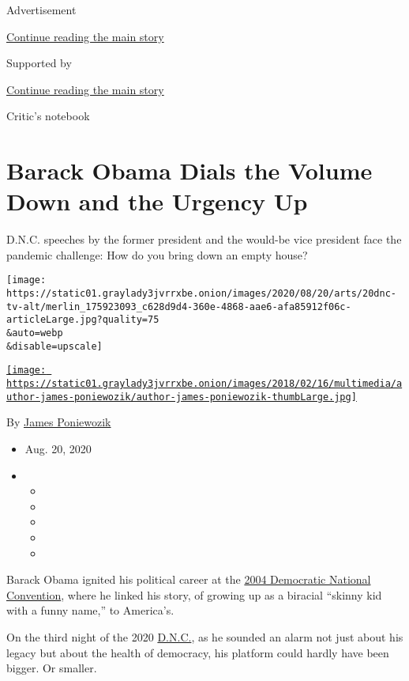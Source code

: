 Advertisement

\protect\hyperlink{after-top}{Continue reading the main story}

Supported by

\protect\hyperlink{after-sponsor}{Continue reading the main story}

Critic's notebook

\hypertarget{barack-obama-dials-the-volume-down-and-the-urgency-up}{%
\section{Barack Obama Dials the Volume Down and the Urgency
Up}\label{barack-obama-dials-the-volume-down-and-the-urgency-up}}

D.N.C. speeches by the former president and the would-be vice president
face the pandemic challenge: How do you bring down an empty house?

\texttt{[image: https://static01.graylady3jvrrxbe.onion/images/2020/08/20/arts/20dnc-tv-alt/merlin\_175923093\_c628d9d4-360e-4868-aae6-afa85912f06c-articleLarge.jpg?quality=75\\\&auto=webp\\\&disable=upscale]}

\href{https://www.nytimes3xbfgragh.onion/by/james-poniewozik}{\texttt{[image: https://static01.graylady3jvrrxbe.onion/images/2018/02/16/multimedia/author-james-poniewozik/author-james-poniewozik-thumbLarge.jpg]}}

By \href{https://www.nytimes3xbfgragh.onion/by/james-poniewozik}{James
Poniewozik}

\begin{itemize}
\item
  Aug. 20, 2020
\item
  \begin{itemize}
  \item
  \item
  \item
  \item
  \item
  \end{itemize}
\end{itemize}

Barack Obama ignited his political career at the
\href{https://www.c-span.org/video/?182718-3/senator-barack-obama-2004-democratic-national-convention-keynote-speech}{2004
Democratic National Convention}, where he linked his story, of growing
up as a biracial ``skinny kid with a funny name,'' to America's.

On the third night of the 2020
\href{https://www.nytimes3xbfgragh.onion/2020/08/20/us/politics/obama-trump-democratic-convention.html}{D.N.C.},
as he sounded an alarm not just about his legacy but about the health of
democracy, his platform could hardly have been bigger. Or smaller.

